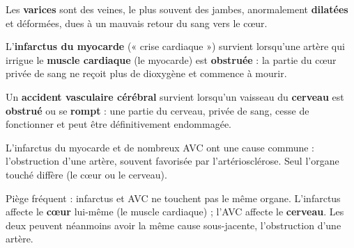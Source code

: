 \begin{illus}
\end{illus}

\begin{definition}[Varices]
Les \textbf{varices} sont des veines, le plus souvent des jambes, anormalement
\textbf{dilatées} et déformées, dues à un mauvais retour du sang vers le cœur.
\end{definition}

\begin{definition}
L'\textbf{infarctus du myocarde} (« crise cardiaque ») survient lorsqu'une artère qui
irrigue le \textbf{muscle cardiaque} (le myocarde) est \textbf{obstruée} : la partie du
cœur privée de sang ne reçoit plus de dioxygène et commence à mourir.
\end{definition}

\begin{definition}
Un \textbf{accident vasculaire cérébral} survient lorsqu'un vaisseau du
\textbf{cerveau} est \textbf{obstrué} ou se \textbf{rompt} : une partie du cerveau,
privée de sang, cesse de fonctionner et peut être définitivement endommagée.
\end{definition}

\begin{propriete}
L'infarctus du myocarde et de nombreux AVC ont une cause commune : l'obstruction
d'une artère, souvent favorisée par l'artériosclérose. Seul l'organe touché diffère
(le cœur ou le cerveau).
\end{propriete}

\begin{remarque}
Piège fréquent : infarctus et AVC ne touchent pas le même organe. L'infarctus affecte
le \textbf{cœur} lui-même (le muscle cardiaque) ; l'AVC affecte le \textbf{cerveau}.
Les deux peuvent néanmoins avoir la même cause sous-jacente, l'obstruction d'une
artère.
\end{remarque}


